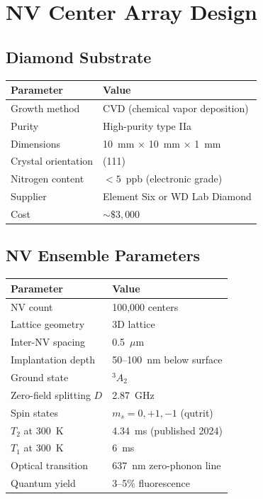 \documentclass[11pt,a4paper,openany]{book}
\begin{document}
\chapter{NV Center Array Design}\label{ch:array}

\section{Diamond Substrate}

\begin{center}
\begin{tabular}{ll}
\toprule
\textbf{Parameter} & \textbf{Value} \\
\midrule
Growth method & CVD (chemical vapor deposition) \\
Purity & High-purity type IIa \\
Dimensions & 10~mm $\times$ 10~mm $\times$ 1~mm \\
Crystal orientation & (111) \\
Nitrogen content & $< 5$~ppb (electronic grade) \\
Supplier & Element Six or WD Lab Diamond \\
Cost & ${\sim}\$3{,}000$ \\
\bottomrule
\end{tabular}
\end{center}

\section{NV Ensemble Parameters}

\begin{center}
\begin{tabular}{ll}
\toprule
\textbf{Parameter} & \textbf{Value} \\
\midrule
NV count & 100,000 centers \\
Lattice geometry & 3D lattice \\
Inter-NV spacing & 0.5~$\mu$m \\
Implantation depth & 50--100~nm below surface \\
Ground state & $^3A_2$ \\
Zero-field splitting $D$ & 2.87~GHz \\
Spin states & $m_s = 0, +1, -1$ (qutrit) \\
$T_2$ at 300~K & 4.34~ms (published 2024) \\
$T_1$ at 300~K & 6~ms \\
Optical transition & 637~nm zero-phonon line \\
Quantum yield & 3--5\% fluorescence \\
\bottomrule
\end{tabular}
\end{center}
\end{document}
